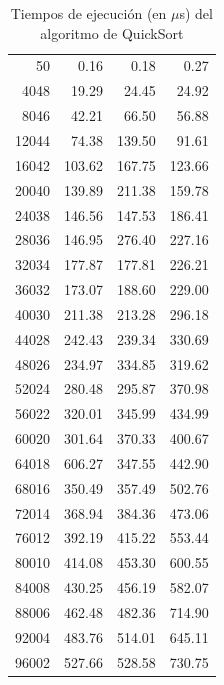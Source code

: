 \documentclass{homework}
\begin{document}
    \begin{table}[h]
        \centering
            \begin{tabular}{|r|r|r|r|}
                50 & 0.16 & 0.18 & 0.27 \\ 
                4048 & 19.29 & 24.45 & 24.92 \\ 
                8046 & 42.21 & 66.50 & 56.88 \\ 
                12044 & 74.38 & 139.50 & 91.61 \\ 
                16042 & 103.62 & 167.75 & 123.66 \\ 
                20040 & 139.89 & 211.38 & 159.78 \\ 
                24038 & 146.56 & 147.53 & 186.41 \\ 
                28036 & 146.95 & 276.40 & 227.16 \\ 
                32034 & 177.87 & 177.81 & 226.21 \\ 
                36032 & 173.07 & 188.60 & 229.00 \\ 
                40030 & 211.38 & 213.28 & 296.18 \\ 
                44028 & 242.43 & 239.34 & 330.69 \\ 
                48026 & 234.97 & 334.85 & 319.62 \\ 
                52024 & 280.48 & 295.87 & 370.98 \\ 
                56022 & 320.01 & 345.99 & 434.99 \\ 
                60020 & 301.64 & 370.33 & 400.67 \\ 
                64018 & 606.27 & 347.55 & 442.90 \\ 
                68016 & 350.49 & 357.49 & 502.76 \\ 
                72014 & 368.94 & 384.36 & 473.06 \\ 
                76012 & 392.19 & 415.22 & 553.44 \\ 
                80010 & 414.08 & 453.30 & 600.55 \\ 
                84008 & 430.25 & 456.19 & 582.07 \\ 
                88006 & 462.48 & 482.36 & 714.90 \\ 
                92004 & 483.76 & 514.01 & 645.11 \\ 
                96002 & 527.66 & 528.58 & 730.75 \\ 
            \end{tabular}
        \caption{Tiempos de ejecución (en $\mu$s) del algoritmo de QuickSort}
    \end{table}
\end{document}
